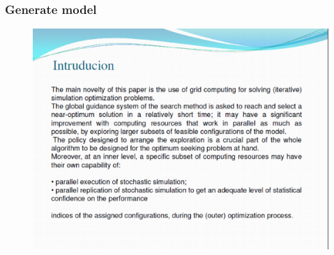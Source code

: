 \documentclass{beamer}
\begin{document}
\begin{frame}
\frametitle{Generate model }
\begin{figure}[!th]
\begin{center}
\includegraphics[width=1\textwidth]{img/pic2.eps}
\end{center}
\end{figure}
\end{frame}
\end{document}
